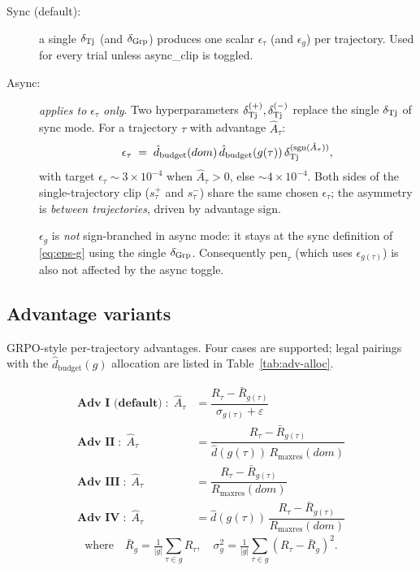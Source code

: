 \documentclass[11pt]{article}
\DeclareMathOperator{\sign}{sgn}
\newcommand{\dbudget}{\hat d_{\text{budget}}}
\begin{document}
\begin{description}
\item[Sync (default):] a single $\delta_{\rm Tj}$ (and
  $\delta_{\rm Grp}$) produces one scalar $\epsilon_\tau$ (and
  $\epsilon_g$) per trajectory. Used for every trial unless
  \textsf{async\_clip} is toggled.
\item[Async:] \emph{applies to $\epsilon_\tau$ only}. Two
  hyperparameters $\delta_{\rm Tj}^{(+)},\delta_{\rm Tj}^{(-)}$
  replace the single $\delta_{\rm Tj}$ of sync mode. For a trajectory
  $\tau$ with advantage $\hat A_\tau$:
  \[
  \epsilon_\tau \;=\; \dbudget(dom)\,\dbudget(g(\tau))\,
                      \delta_{\rm Tj}^{(\sign(\hat A_\tau))},
  \]
  with target $\epsilon_\tau \sim 3\!\times\!10^{-4}$ when
  $\hat A_\tau>0$, else $\sim 4\!\times\!10^{-4}$. Both sides of the
  single-trajectory clip ($s_\tau^+$ and $s_\tau^-$) share the same
  chosen $\epsilon_\tau$; the asymmetry is \emph{between
  trajectories}, driven by advantage sign.

  $\epsilon_g$ is \emph{not} sign-branched in async mode: it stays at
  the sync definition of \eqref{eq:eps-g} using the single
  $\delta_{\rm Grp}$. Consequently $\mathrm{pen}_\tau$ (which uses
  $\epsilon_{g(\tau)}$) is also not affected by the async toggle.
\end{description}

\subsection{Advantage variants}

GRPO-style per-trajectory advantages. Four cases are supported; legal
pairings with the $\dbudget(g)$ allocation are listed in
Table~\ref{tab:adv-alloc}.

\begin{align}
\textbf{Adv~I (default)}\;:\;
\hat A_\tau &= \dfrac{R_\tau - \bar R_{g(\tau)}}{\sigma_{g(\tau)} + \varepsilon}
  \label{eq:adv-I} \\[2pt]
\textbf{Adv~II}\;:\;
\hat A_\tau &= \dfrac{R_\tau - \bar R_{g(\tau)}}
                    {\hat d(g(\tau))\,R_{\max\text{res}}(dom)}
  \label{eq:adv-II} \\[2pt]
\textbf{Adv~III}\;:\;
\hat A_\tau &= \dfrac{R_\tau - \bar R_{g(\tau)}}{R_{\max\text{res}}(dom)}
  \label{eq:adv-III} \\[2pt]
\textbf{Adv~IV}\;:\;
\hat A_\tau &= \hat d(g(\tau))\,\dfrac{R_\tau - \bar R_{g(\tau)}}{R_{\max\text{res}}(dom)}
  \label{eq:adv-IV}
\end{align}
\[
\text{where}\quad
\bar R_g = \tfrac{1}{|g|}\sum_{\tau\in g}R_\tau,\quad
\sigma_g^{2} = \tfrac{1}{|g|}\sum_{\tau\in g}(R_\tau - \bar R_g)^{2}.
\]
\end{document}
